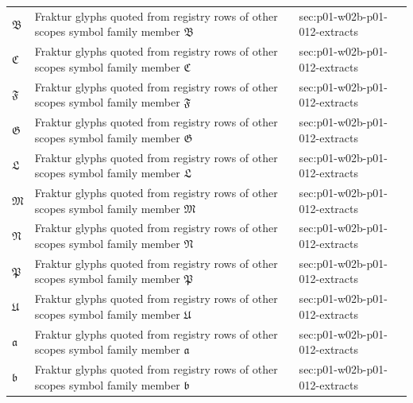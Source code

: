 \begin{longtable}{@{}p{}p{}p{}@{}}
\(\mathfrak B\) & Fraktur glyphs quoted from registry rows of other scopes symbol family member \(\mathfrak B\) & sec:\allowbreak{}p01-\allowbreak{}w02b-\allowbreak{}p01-\allowbreak{}012-\allowbreak{}extracts \\
\(\mathfrak C\) & Fraktur glyphs quoted from registry rows of other scopes symbol family member \(\mathfrak C\) & sec:\allowbreak{}p01-\allowbreak{}w02b-\allowbreak{}p01-\allowbreak{}012-\allowbreak{}extracts \\
\(\mathfrak F\) & Fraktur glyphs quoted from registry rows of other scopes symbol family member \(\mathfrak F\) & sec:\allowbreak{}p01-\allowbreak{}w02b-\allowbreak{}p01-\allowbreak{}012-\allowbreak{}extracts \\
\(\mathfrak G\) & Fraktur glyphs quoted from registry rows of other scopes symbol family member \(\mathfrak G\) & sec:\allowbreak{}p01-\allowbreak{}w02b-\allowbreak{}p01-\allowbreak{}012-\allowbreak{}extracts \\
\(\mathfrak L\) & Fraktur glyphs quoted from registry rows of other scopes symbol family member \(\mathfrak L\) & sec:\allowbreak{}p01-\allowbreak{}w02b-\allowbreak{}p01-\allowbreak{}012-\allowbreak{}extracts \\
\(\mathfrak M\) & Fraktur glyphs quoted from registry rows of other scopes symbol family member \(\mathfrak M\) & sec:\allowbreak{}p01-\allowbreak{}w02b-\allowbreak{}p01-\allowbreak{}012-\allowbreak{}extracts \\
\(\mathfrak N\) & Fraktur glyphs quoted from registry rows of other scopes symbol family member \(\mathfrak N\) & sec:\allowbreak{}p01-\allowbreak{}w02b-\allowbreak{}p01-\allowbreak{}012-\allowbreak{}extracts \\
\(\mathfrak P\) & Fraktur glyphs quoted from registry rows of other scopes symbol family member \(\mathfrak P\) & sec:\allowbreak{}p01-\allowbreak{}w02b-\allowbreak{}p01-\allowbreak{}012-\allowbreak{}extracts \\
\(\mathfrak U\) & Fraktur glyphs quoted from registry rows of other scopes symbol family member \(\mathfrak U\) & sec:\allowbreak{}p01-\allowbreak{}w02b-\allowbreak{}p01-\allowbreak{}012-\allowbreak{}extracts \\
\(\mathfrak a\) & Fraktur glyphs quoted from registry rows of other scopes symbol family member \(\mathfrak a\) & sec:\allowbreak{}p01-\allowbreak{}w02b-\allowbreak{}p01-\allowbreak{}012-\allowbreak{}extracts \\
\(\mathfrak b\) & Fraktur glyphs quoted from registry rows of other scopes symbol family member \(\mathfrak b\) & sec:\allowbreak{}p01-\allowbreak{}w02b-\allowbreak{}p01-\allowbreak{}012-\allowbreak{}extracts \\

\end{longtable}
